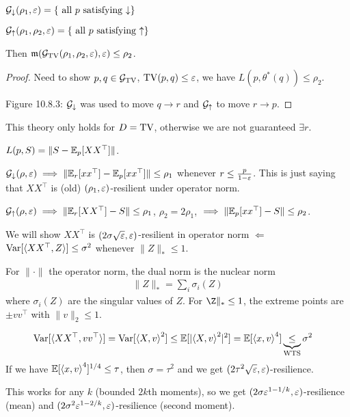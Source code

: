 \begin{proposition}
  $\mathcal{G}_{\downarrow}(\rho_1, \varepsilon) = \{\text{ all $p$ satisfying $\downarrow$}\}$

  $\mathcal{G}_{\uparrow}(\rho_1, \rho_2, \varepsilon) = \{\text{ all $p$ satisfying $\uparrow$}\}$


  Then $\mathfrak{m}(\mathcal{G}_{\operatorname{TV}}(\rho_1, \rho_2, \varepsilon), \varepsilon) \leq \rho_2$.
\end{proposition}

\begin{proof}
  Need to show $p, q \in \mathcal{G}_{\operatorname{TV}}$, $\operatorname{TV}(p, q) \leq \varepsilon$, we have
  $L(p, \theta^*(q)) \leq \rho_2$.

  Figure 10.8.3: $\mathcal{G}_\downarrow$ was used to move $q \to r$
  and $\mathcal{G}_\uparrow$ to move $r \to p$.
\end{proof}

\begin{remark}
  This theory only holds for $D = \operatorname{TV}$, otherwise we are not guaranteed $\exists r$.
\end{remark}

\begin{example}
  $L(p, S) = \|S - \mathbb{E}_p[ X X^\top]\|$.

  $\mathcal{G}_\downarrow(\rho, \varepsilon) \implies \|\mathbb{E}_r[x x^\top] - \mathbb{E}_p[x x^\top]\| \leq \rho_1$
  whenever $r \leq \frac{p}{1-\varepsilon}$.
  This is just saying that $X X^\top$ is (old) $(\rho_1, \varepsilon)$-resilient under
  operator norm.

  $\mathcal{G}_\uparrow(\rho, \varepsilon) \implies \|\mathbb{E}_r[X X^\top] - S\| \leq \rho_1$,
  $\rho_2 = 2 \rho_1$, $\implies \|\mathbb{E}_p[x x^\top] - S\| \leq \rho_2$.

  We will show $X X^\top$ is $(2 \sigma \sqrt{\varepsilon}, \varepsilon)$-resilient in operator
  norm $\Leftarrow$ $\operatorname{Var}[\braket{X X^\top, Z}] \leq \sigma^2$ whenever $\|Z\|_* \leq 1$.

  For $\|\cdot\|$ the operator norm, the dual norm is the nuclear norm
  \begin{align}
    \|Z\|_* = \sum_i \sigma_i(Z)
  \end{align}
  where $\sigma_i(Z)$ are the singular values of $Z$.
  For $\Z\|_* \leq 1$, the extreme points are $\pm v v^\top$
  with $\|v\|_2 \leq 1$.

  \begin{align}
    \operatorname{Var}[\braket{X X^\top, v v^\top}]
    &= \operatorname{Var}[\braket{X, v}^2]
    \leq \mathbb{E}[\lvert \braket{X, v}^2 \rvert^2]
    = \mathbb{E}[\braket{x, v}^4]
    \underbrace{\leq}_{\text{WTS}} \sigma^2
  \end{align}
  If we have $\mathbb{E}[\braket{x, v}^4]^{1/4} \leq \tau$,
  then $\sigma = \tau^2$ and we get $(2 \tau^2 \sqrt{\varepsilon}, \varepsilon)$-resilience.

  This works for any $k$ (bounded $2k$th moments), so we get
  $(2 \sigma \varepsilon^{1 - 1/k}, \varepsilon)$-resilience (mean)
  and $(2 \sigma^2 \varepsilon^{1 - 2/k}, \varepsilon)$-resilience (second moment).
\end{example}


